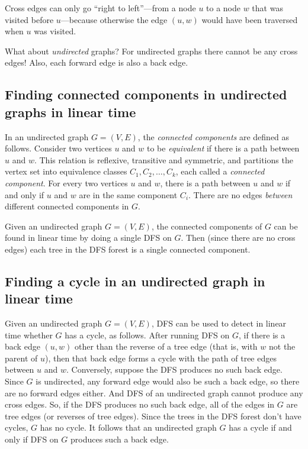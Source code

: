 \documentclass[11pt]{article}
\begin{document}
Cross edges can only go ``right to left''---from a node $u$ to a node $w$ that was visited before $u$---because otherwise the edge $(u,w)$ would have been traversed
when $u$ was visited.

What about \emph{undirected} graphs?
For undirected graphs there cannot be any cross edges!
Also, each forward edge is also a back edge.

\subsection{Finding connected components in undirected graphs in linear time} 
In an undirected graph $G=(V,E)$,
the \emph{connected components} are defined as follows.
Consider two vertices $u$ and $w$ to be \emph{equivalent}
if there is a path between $u$ and $w$.
This relation is reflexive, transitive and symmetric,
and partitions the vertex set into equivalence classes
$C_1, C_2, \ldots, C_k$,
each called a \emph{connected component}.
For every two vertices $u$ and $w$,
there is a path between $u$ and $w$
if and only if $u$ and $w$ are in the same component $C_i$.
There are no edges \emph{between} different connected components in $G$.

Given an undirected graph $G=(V,E)$,
the connected components of $G$ can be found in linear time
by doing a single DFS on $G$.
Then (since there are no cross edges)
each tree in the DFS forest is a single connected component.


\subsection{Finding a cycle in an undirected graph in linear time} 
Given an undirected graph $G=(V,E)$,
DFS can be used to detect in linear time whether $G$ has a cycle, as follows.
After running DFS on $G$, if there is a back edge $(u,w)$
other than the reverse of a tree edge (that is, with $w$ not the parent of $u$),
then that back edge forms a cycle with the path of tree edges between $u$ and $w$.
Conversely, suppose the DFS produces no such back edge.
Since $G$ is undirected, any forward edge would also be such a back edge,
so there are no forward edges either.
And DFS of an undirected graph cannot produce any cross edges.
So, if the DFS produces no such back edge, all of the edges in $G$
are tree edges (or reverses of tree edges).  Since the trees in the DFS forest don't have cycles, $G$ has no cycle.
It follows that an undirected graph $G$ has a cycle
if and only if DFS on $G$ produces such a back edge.
\end{document}
